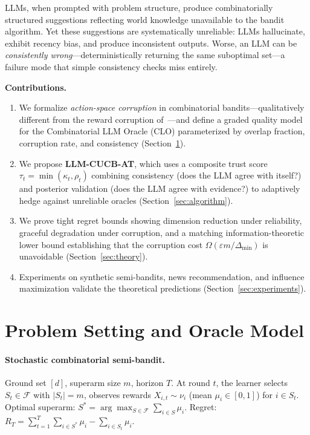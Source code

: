 \documentclass{article}
\newcommand{\Fset}{\mathcal{F}}
\newcommand{\Sstar}{S^{*}}
\begin{document}
LLMs, when prompted with problem structure, produce combinatorially structured suggestions reflecting world knowledge unavailable to the bandit algorithm.
Yet these suggestions are systematically unreliable: LLMs hallucinate, exhibit recency bias, and produce inconsistent outputs.
Worse, an LLM can be \emph{consistently wrong}---deterministically returning the same suboptimal set---a failure mode that simple consistency checks miss entirely.

\textbf{Contributions.}
\begin{enumerate}
    \item We formalize \emph{action-space corruption} in combinatorial bandits---qualitatively different from the reward corruption of~\citet{lykouris2018}---and define a graded quality model for the Combinatorial LLM Oracle (CLO) parameterized by overlap fraction, corruption rate, and consistency (Section~\ref{sec:model}).

    \item We propose \textbf{LLM-CUCB-AT}, which uses a composite trust score $\tau_t = \min(\kappa_t, \rho_t)$ combining consistency (does the LLM agree with itself?) and posterior validation (does the LLM agree with evidence?) to adaptively hedge against unreliable oracles (Section~\ref{sec:algorithm}).

    \item We prove tight regret bounds showing dimension reduction under reliability, graceful degradation under corruption, and a matching information-theoretic lower bound establishing that the corruption cost $\Omega(\varepsilon m / \Delta_{\min})$ is unavoidable (Section~\ref{sec:theory}).

    \item Experiments on synthetic semi-bandits, news recommendation, and influence maximization validate the theoretical predictions (Section~\ref{sec:experiments}).
\end{enumerate}

\section{Problem Setting and Oracle Model}
\label{sec:model}

\paragraph{Stochastic combinatorial semi-bandit.}
Ground set $[d]$, superarm size $m$, horizon $T$.
At round $t$, the learner selects $S_t \in \Fset$ with $|S_t| = m$, observes rewards $X_{i,t} \sim \nu_i$ (mean $\mu_i \in [0,1]$) for $i \in S_t$.
Optimal superarm: $\Sstar = \arg\max_{S \in \Fset} \sum_{i \in S} \mu_i$.
Regret: $R_T = \sum_{t=1}^{T} \sum_{i \in \Sstar} \mu_i - \sum_{i \in S_t} \mu_i$.
\end{document}
